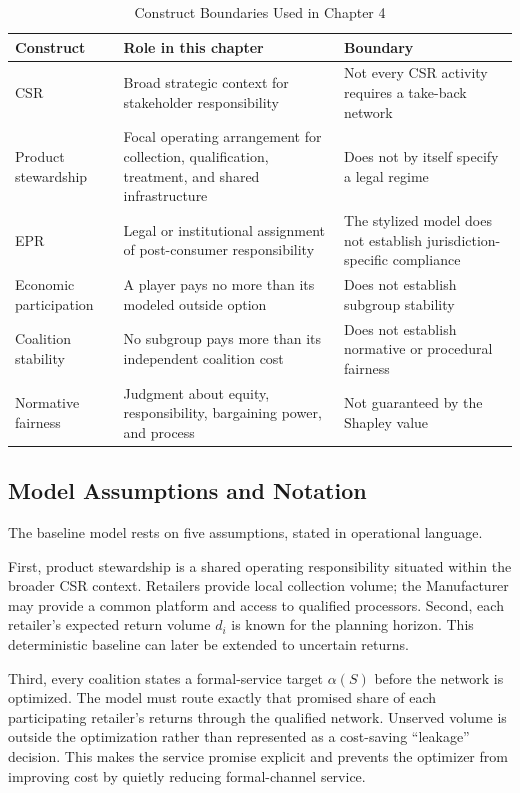 \begin{table}[htbp]
\centering
\caption{Construct Boundaries Used in Chapter 4}
\label{tab:ch4_construct_boundaries}
\small
\begin{tabular}{@{}p{}p{}p{}@{}}
\toprule
\textbf{Construct} & \textbf{Role in this chapter} & \textbf{Boundary} \\
\midrule
CSR & Broad strategic context for stakeholder responsibility & Not every CSR activity requires a take-back network \\
Product stewardship & Focal operating arrangement for collection, qualification, treatment, and shared infrastructure & Does not by itself specify a legal regime \\
EPR & Legal or institutional assignment of post-consumer responsibility & The stylized model does not establish jurisdiction-specific compliance \\
Economic participation & A player pays no more than its modeled outside option & Does not establish subgroup stability \\
Coalition stability & No subgroup pays more than its independent coalition cost & Does not establish normative or procedural fairness \\
Normative fairness & Judgment about equity, responsibility, bargaining power, and process & Not guaranteed by the Shapley value \\
\bottomrule
\end{tabular}
\normalsize
\end{table}

\subsection{Model Assumptions and Notation}
\label{sec:notation}

The baseline model rests on five assumptions, stated in operational language.

First, product stewardship is a shared operating responsibility situated within the broader CSR context. Retailers provide local collection volume; the Manufacturer may provide a common platform and access to qualified processors. Second, each retailer's expected return volume $d_i$ is known for the planning horizon. This deterministic baseline can later be extended to uncertain returns.

Third, every coalition states a formal-service target $\alpha(S)$ before the network is optimized. The model must route exactly that promised share of each participating retailer's returns through the qualified network. Unserved volume is outside the optimization rather than represented as a cost-saving ``leakage'' decision. This makes the service promise explicit and prevents the optimizer from improving cost by quietly reducing formal-channel service.

